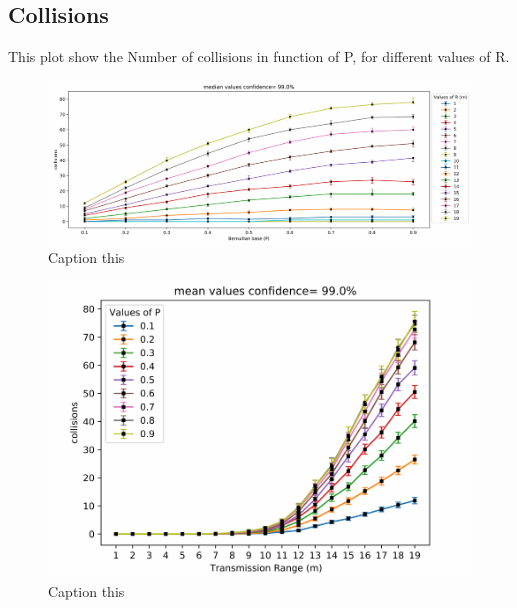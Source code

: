\subsection{Collisions}
This plot show the Number of collisions in function of P, for different values of R.
\begin{figure}[H]
    \begin{center}
        \includegraphics[scale=.4]{img/Big_CollP_median.pdf}
    \end{center}
    \vspace*{-0.5cm}
    \caption{Caption this}
    \label{fig:floorplancoverage5}
\end{figure}
\begin{figure}[H]
    \begin{center}
        \includegraphics[scale=.7]{img/Big_CollRange_mean.pdf}
    \end{center}
    \vspace*{-0.5cm}
    \caption{Caption this}
    \label{fig:floorplancoverage6}
\end{figure}
